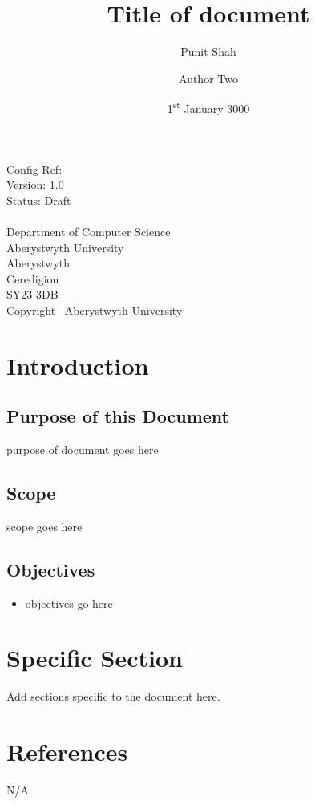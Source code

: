 \documentclass[12pt]{article}
\title{Title of document}
\author{Punit Shah \and Author Two} %
\date{1\textsuperscript{st} January 3000} %
\begin{document}
\maketitle
\thispagestyle{headerfooter}
\pagestyle{headerfooter}

\begin{center}
	Config Ref: \\ %
	Version: 1.0\\ %
	Status: Draft\\ %
	~\\
	Department of Computer Science\\
	Aberystwyth University\\
	Aberystwyth\\
	Ceredigion\\
	SY23 3DB\\
	Copyright \textcopyright~Aberystwyth University
\end{center}

\clearpage

\tableofcontents
\clearpage

\section{Introduction}
	\subsection{Purpose of this Document}
	purpose of document goes here
	\subsection{Scope}
	scope goes here
	\subsection{Objectives}
	\begin{itemize}
		\item objectives go here
	\end{itemize}

\section{Specific Section}
Add sections specific to the document here.

\section{References}
N/A %

\begin{versionhistory}
\end{versionhistory}
\end{document}
